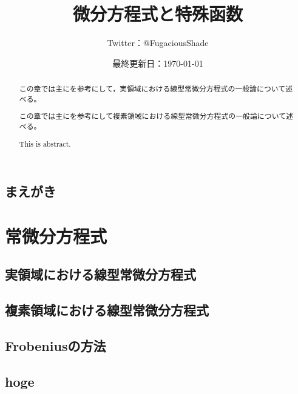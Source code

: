 \documentclass[b5paper,oneside,openany]{ltjsbook} %
\title{微分方程式と特殊函数}
\author{Twitter：@FugaciousShade}
\date{最終更新日：\today}
\begin{document}
\maketitle %

\chapter*{まえがき}{
    
}
\fi

\tableofcontents  %






\part{常微分方程式}
\chapter{実領域における線型常微分方程式}{
    \begin{abstract}
        この章では主に\cite{takano}を参考にして，実領域における線型常微分方程式の一般論について述べる。
    \end{abstract}
    
}

\chapter{複素領域における線型常微分方程式}{
    \begin{abstract}
        この章では主に\cite{takano}を参考にして複素領域における線型常微分方程式の一般論について述べる。
    \end{abstract}
    
}

\chapter{Frobeniusの方法}{
    \begin{abstract}
        This is abstract.
    \end{abstract}
    
}
\fi

\appendix
{}
\chapter{hoge}{
}
\fi




\end{document}
